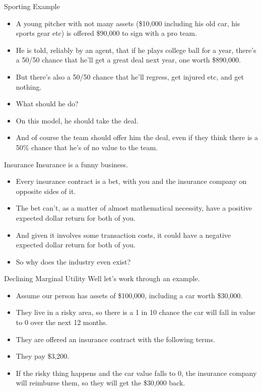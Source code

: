 \documentclass[
  ignorenonframetext,
]{beamer}
\providecommand{\tightlist}{%
  \setlength{\itemsep}{0pt}\setlength{\parskip}{0pt}}
\renewcommand{\,}{\text{, }}
\begin{document}
\begin{frame}{Sporting Example}
\protect\hypertarget{sporting-example}{}
\begin{itemize}
\tightlist
\item
  A young pitcher with not many assets (\$10,000 including his old car,
  his sports gear etc) is offered \$90,000 to sign with a pro team.
\item
  He is told, reliably by an agent, that if he plays college ball for a
  year, there's a 50/50 chance that he'll get a great deal next year,
  one worth \$890,000.
\item
  But there's also a 50/50 chance that he'll regress, get injured etc,
  and get nothing.
\item
  What should he do?
\item
  On this model, he should take the deal.
\item
  And of course the team should offer him the deal, even if they think
  there is a 50\% chance that he's of no value to the team.
\end{itemize}
\end{frame}

\begin{frame}{Insurance}
\protect\hypertarget{insurance}{}
Insurance is a funny business.

\begin{itemize}
\tightlist
\item
  Every insurance contract is a bet, with you and the insurance company
  on opposite sides of it.
\item
  The bet can't, as a matter of almost mathematical necessity, have a
  positive expected dollar return for both of you.
\item
  And given it involves some transaction costs, it could have a negative
  expected dollar return for both of you.
\item
  So why does the industry even exist?
\end{itemize}
\end{frame}

\begin{frame}{Declining Marginal Utility}
\protect\hypertarget{declining-marginal-utility}{}
Well let's work through an example.

\begin{itemize}
\tightlist
\item
  Assume our person has assets of \$100,000, including a car worth
  \$30,000.
\item
  They live in a risky area, so there is a 1 in 10 chance the car will
  fall in value to 0 over the next 12 months.
\item
  They are offered an insurance contract with the following terms.
\item
  They pay \$3,200.
\item
  If the risky thing happens and the car value falls to 0, the insurance
  company will reimburse them, so they will get the \$30,000 back.
\end{itemize}
\end{frame}
\end{document}
